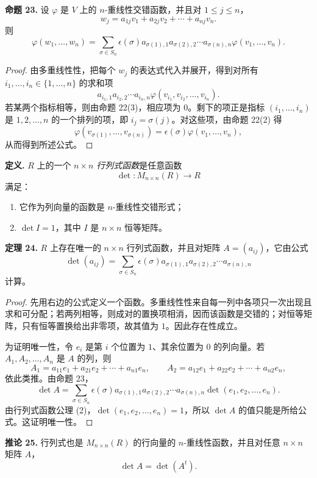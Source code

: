 \noindent\textbf{命题 23.} 设 $\varphi$ 是 $V$ 上的 $n$-重线性交错函数，并且对 $1\leq j\leq n$，
\[
w_j=a_{1j}v_1+a_{2j}v_2+\cdots+a_{nj}v_n.
\]
则
\[
\varphi(w_1,\ldots,w_n)
=\sum_{\sigma\in S_n}\epsilon(\sigma)
 a_{\sigma(1),1}a_{\sigma(2),2}\cdots a_{\sigma(n),n}
 \varphi(v_1,
\ldots,v_n).
\]

\begin{proof}
由多重线性性，把每个 $w_j$ 的表达式代入并展开，得到对所有 $i_1,
\ldots,i_n\in\{1,\ldots,n\}$ 的求和项
\[
a_{i_1,1}a_{i_2,2}\cdots a_{i_n,n}
\varphi(v_{i_1},v_{i_2},\ldots,v_{i_n}).
\]
若某两个指标相等，则由命题 22(3)，相应项为 $0$。剩下的项正是指标 $(i_1,
\ldots,i_n)$ 是 $1,
2,
\ldots,n$ 的一个排列的项，即 $i_j=\sigma(j)$。对这些项，由命题 22(2) 得
\[
\varphi(v_{\sigma(1)},\ldots,v_{\sigma(n)})
=\epsilon(\sigma)\varphi(v_1,
\ldots,v_n),
\]
从而得到所述公式。
\end{proof}

\noindent\textbf{定义.} $R$ 上的一个 $n\times n$ \emph{行列式函数}是任意函数
\[
\det:M_{n\times n}(R)\to R
\]
满足：
\begin{enumerate}[label=(\arabic*)]
\item 它作为列向量的函数是 $n$-重线性交错形式；
\item $\det I=1$，其中 $I$ 是 $n\times n$ 恒等矩阵。
\end{enumerate}

\noindent\textbf{定理 24.} $R$ 上存在唯一的 $n\times n$ 行列式函数，并且对矩阵 $A=(a_{ij})$，它由公式
\[
\det(a_{ij})=
\sum_{\sigma\in S_n}\epsilon(\sigma)
 a_{\sigma(1),1}a_{\sigma(2),2}\cdots a_{\sigma(n),n}
\]
计算。

\begin{proof}
先用右边的公式定义一个函数。多重线性性来自每一列中各项只一次出现且求和可分配；若两列相等，则成对的置换项相消，因而该函数是交错的；对恒等矩阵，只有恒等置换给出非零项，故其值为 $1$。因此存在性成立。

为证明唯一性，令 $e_i$ 是第 $i$ 个位置为 $1$、其余位置为 $0$ 的列向量。若 $A_1,A_2,
\ldots,A_n$ 是 $A$ 的列，则
\[
A_1=a_{11}e_1+a_{21}e_2+\cdots+a_{n1}e_n,
\qquad
A_2=a_{12}e_1+a_{22}e_2+\cdots+a_{n2}e_n,
\]
依此类推。由命题 23，
\[
\det A=
\sum_{\sigma\in S_n}\epsilon(\sigma)
 a_{\sigma(1),1}a_{\sigma(2),2}\cdots a_{\sigma(n),n}
 \det(e_1,e_2,
\ldots,e_n).
\]
由行列式函数公理 (2)，$\det(e_1,e_2,
\ldots,e_n)=1$，所以 $\det A$ 的值只能是所给公式。这证明唯一性。
\end{proof}

\noindent\textbf{推论 25.} 行列式也是 $M_{n\times n}(R)$ 的行向量的 $n$-重线性函数，并且对任意 $n\times n$ 矩阵 $A$，
\[
\det A=\det(A^t).
\]

